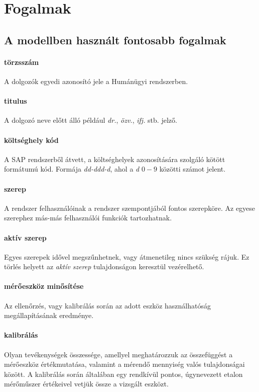 \documentclass[a4paper,12pt]{report}
\begin{document}
\section{Fogalmak}
%
\subsection{A modellben használt fontosabb fogalmak}

\paragraph*{törzsszám} A dolgozók egyedi azonosító jele a Humánügyi rendszerben. 

\paragraph*{titulus} A dolgozó neve előtt álló például \textit{dr.}, \textit{özv.}, \textit{ifj.} stb.
jelző.

\paragraph*{költséghely kód} A SAP rendszerből átvett, a költséghelyek azonosítására 
szolgáló kötött formátumú kód. Formája \textit{dd-ddd-d}, ahol a \textit{d} $0-9$ közötti
számot jelent.

\paragraph*{szerep} A rendszer felhasználóinak a rendszer szempontjából fontos
szerepköre. Az egyese szerephez más-más felhasználói funkciók tartozhatnak.

\paragraph*{aktív szerep} Egyes szerepek idővel megszűnhetnek, vagy átmenetileg
nincs szükség rájuk. Ez törlés helyett az \textit{aktív szerep} tulajdonságon keresztül vezérelhető.

\paragraph*{mérőeszköz minősítése} Az ellenőrzés, vagy kalibrálás során az adott
eszköz használhatóság megállapításának eredménye.

\paragraph*{kalibrálás} Olyan tevékenységek összessége, amellyel meghatározzuk az
összefüggést a mérőeszköz értékmutatása, valamint a mérendő mennyiség valós
tulajdonságai között. A kalibrálás során általában egy rendkívül pontos, úgynevezett
etalon mérőműszer értékeivel vetjük össze a vizsgált eszközt.
\end{document}
